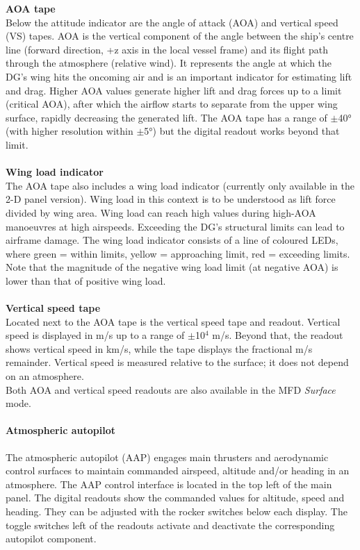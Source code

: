 \documentclass[Orbiter User Manual.tex]{subfiles}
\begin{document}
\noindent
\textbf{AOA tape}\\
Below the attitude indicator are the angle of attack (AOA) and vertical speed (VS) tapes. AOA is the vertical component of the angle between the ship's centre line (forward direction, +z axis in the local vessel frame) and its flight path through the atmosphere (relative wind). It represents the angle at which the DG's wing hits the oncoming air and is an important indicator for estimating lift and drag. Higher AOA values generate higher lift and drag forces up to a limit (critical AOA), after which the airflow starts to separate from the upper wing surface, rapidly decreasing the generated lift. The AOA tape has a range of $\pm$40° (with higher resolution within $\pm$5°) but the digital readout works beyond that limit.\\
\\
\textbf{Wing load indicator}\\
The AOA tape also includes a wing load indicator (currently only available in the 2-D panel version). Wing load in this context is to be understood as lift force divided by wing area. Wing load can reach high values during high-AOA manoeuvres at high airspeeds. Exceeding the DG's structural limits can lead to airframe damage. The wing load indicator consists of a line of coloured LEDs, where green = within limits, yellow = approaching limit, red = exceeding limits. Note that the magnitude of the negative wing load limit (at negative AOA) is lower than that of positive wing load.\\
\\
\textbf{Vertical speed tape}\\
Located next to the AOA tape is the vertical speed tape and readout. Vertical speed is displayed in m/s up to a range of $\pm$10$^{4}$ m/s. Beyond that, the readout shows vertical speed in km/s, while the tape displays the fractional m/s remainder. Vertical speed is measured relative to the surface; it does not depend on an atmosphere.\\
Both AOA and vertical speed readouts are also available in the MFD \textit{Surface} mode.


\paragraph{Atmospheric autopilot}
\label{para:dg_aap}
The atmospheric autopilot (AAP) engages main thrusters and aerodynamic control surfaces to maintain commanded airspeed, altitude and/or heading in an atmosphere. The AAP control interface is located in the top left of the main panel. The digital readouts show the commanded values for altitude, speed and heading. They can be adjusted with the rocker switches below each display. The toggle switches left of the readouts activate and deactivate the corresponding autopilot component.
\end{document}
